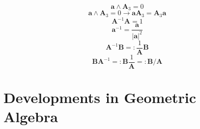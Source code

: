 \documentclass[11pt, a4paper, fleqn]{report}
\numberwithin{equation}{section}
\begin{document}
\begin{equation}\tag{1.7.14a}
    \mathbf{a}\wedge\mathbf{A}_3=0
\end{equation}
\begin{equation}\tag{1.7.14b}
    \mathbf{a}\wedge\mathbf{A}_3=0\rightarrow\mathbf{a}\mathbf{A}_3=\mathbf{A}_3\mathbf{a}
\end{equation}
\setcounter{equation}{14}%
\begin{equation}
    \mathbf{A}^{-1}\mathbf{A}=1
\end{equation}
\begin{equation}
    \mathbf{a}^{-1}=\frac{\mathbf{a}}{|\mathbf{a}|^2}
\end{equation}
\begin{equation}
    \mathbf{A}^{-1}\mathbf{B}=:\frac{1}{\mathbf{A}}\mathbf{B}
\end{equation}
\begin{equation}
    \mathbf{B}\mathbf{A}^{-1}=:\mathbf{B}\frac{1}{\mathbf{A}}=:\mathbf{B}/\mathbf{A}
\end{equation}


\chapter{Developments in Geometric Algebra}
\end{document}
